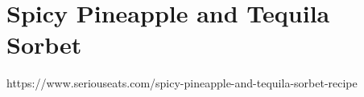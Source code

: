 \clearpage

\section{Spicy Pineapple and Tequila Sorbet}

https://www.seriouseats.com/spicy-pineapple-and-tequila-sorbet-recipe
